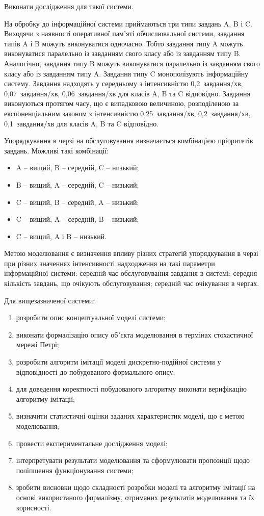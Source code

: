 
Виконати дослідження для такої системи.

На обробку до інформаційної системи приймаються три типи завдань A, B і C. Виходячи з наявності
оперативної памʼяті обчислювальної системи, завдання типів A і B можуть виконуватися одночасно. Тобто
завдання типу A можуть виконуватися паралельно із завданням свого класу або із завданням типу B.
Аналогічно, завдання типу B можуть виконуватися паралельно із завданням свого класу або із завданням
типу A. Завдання типу C монополізують інформаційну систему. Завдання надходять у середньому з
інтенсивністю 0,2~завдання/хв, 0,07~завдання/хв, 0,06~завдання/хв для класів A, B та C відповідно.
Завдання виконуються протягом часу, що є випадковою величиною, розподіленою за експоненціальним законом
з інтенсивністю 0,25~завдання/хв, 0,2~завдання/хв, 0,1~завдання/хв для класів A, B та C відповідно.

Упорядкування в черзі на обслуговування визначається комбінацією пріоритетів завдань. Можливі такі
комбінації:
\begin{itemize}
\item A -- вищий, B -- середній, C -- низький;
\item B -- вищий, A -- середній, C -- низький;
\item C -- вищий, B -- середній, A -- низький;
\item C -- вищий, A -- середній, B -- низький;
\item C -- вищий, A і B -- низький.
\end{itemize}

Метою моделювання є визначення впливу різних стратегій упорядкування в черзі при різних значеннях
інтенсивності надходження на такі параметри інформаційної системи: середній час обслуговування завдання
в системі; середня кількість завдань, що очікують обслуговування; середній час очікування в чергах.

Для вищезазначеної системи:
\begin{enumerate}
\item розробити опис концептуальної моделі системи;
\item виконати формалізацію опису обʼєкта моделювання в термінах стохастичної мережі Петрі;
\item розробити алгоритм імітації моделі дискретно-подійної системи у відповідності до побудованого
  формального опису;
\item для доведення коректності побудованого алгоритму виконати верифікацію алгоритму імітації;
\item визначити статистичні оцінки заданих характеристик моделі, що є метою моделювання;
\item провести експериментальне дослідження моделі;
\item інтерпретувати результати моделювання та сформулювати пропозиції щодо поліпшення функціонування
  системи;
\item зробити висновки щодо складності розробки моделі та алгоритму імітації на основі використаного
  формалізму, отриманих результатів моделювання та їх корисності.
\end{enumerate}
